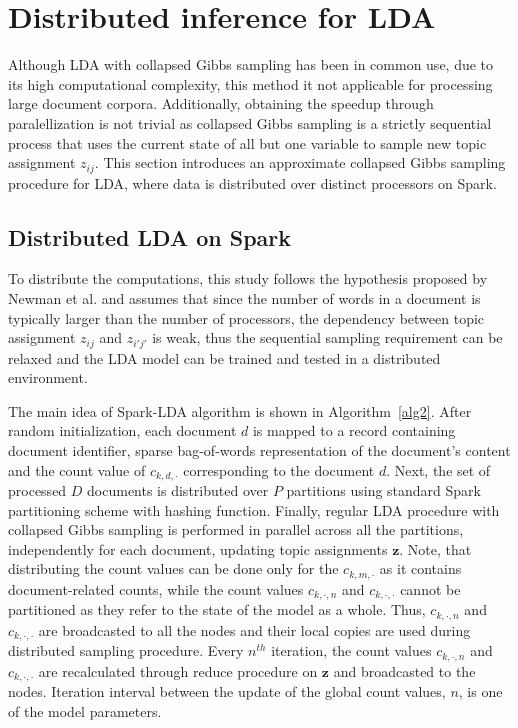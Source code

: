 \documentclass[journal]{IEEEtran}
\begin{document}
\section{Distributed inference for LDA}
\label{sec:slda}
Although LDA with collapsed Gibbs sampling has been in common use, due to its high computational complexity, this method it not applicable for processing large document corpora. Additionally, obtaining the speedup through paralellization is not trivial as collapsed Gibbs sampling is a strictly sequential process that uses the current state of all but one variable to sample new topic assignment $z_{ij}$. This section introduces an approximate collapsed Gibbs sampling procedure for LDA, where data is distributed over distinct processors on Spark.

\subsection{Distributed LDA on Spark}
To distribute the computations, this study follows the hypothesis proposed by Newman et al.\cite{newman2009distributed} and assumes that since the number of words in a document is typically larger than the number of processors, the dependency between topic assignment $z_{ij}$ and $z_{i'j'}$ is weak, thus the sequential sampling requirement can be relaxed and the LDA model can be trained and tested in a distributed environment. 

The main idea of Spark-LDA algorithm is shown in Algorithm~\ref{alg2}. After random initialization, each document $d$ is mapped to a record containing document identifier, sparse bag-of-words representation of the document's content and the count value of $c_{k,d,\cdot}$ corresponding to the document $d$. Next, the set of processed $D$ documents is distributed over $P$ partitions using standard Spark partitioning scheme with hashing function. Finally, regular LDA procedure with collapsed Gibbs sampling is performed in parallel across all the partitions, independently for each document, updating topic assignments $\textbf{z}$.  Note, that distributing the count values can be done only for the $c_{k,m,\cdot}$ as it contains document-related counts, while the count values $c_{k,\cdot,n}$ and $c_{k,\cdot,\cdot}$ cannot be partitioned as they refer to the state of the model as a whole. Thus, $c_{k,\cdot,n}$ and $c_{k,\cdot,\cdot}$ are broadcasted to all the nodes and their local copies are used during distributed sampling procedure. Every $n^{th}$ iteration, the count values $c_{k,\cdot,n}$ and $c_{k,\cdot,\cdot}$ are recalculated through reduce procedure on $\textbf{z}$ and broadcasted to the nodes. Iteration interval between the update of the global count values, $n$, is one of the model parameters.
\end{document}
